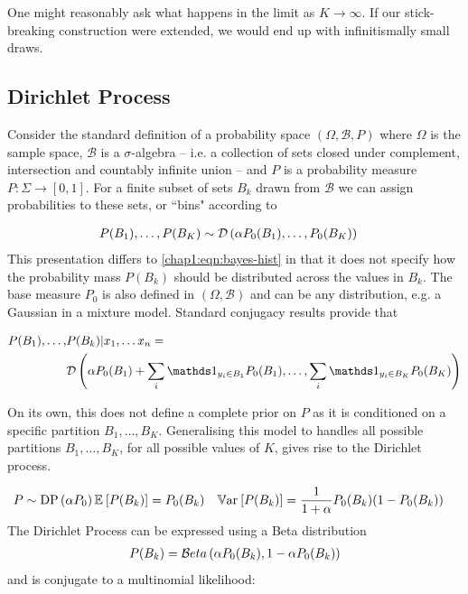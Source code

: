 One might reasonably ask what happens in the limit as $K \rightarrow \infty$. If our stick-breaking construction were extended, we would end up with infinitismally small draws.


\newcommand \sampspace { { \Omega } }
\newcommand \borel { { \mathcal{B} } }

\subsection{Dirichlet Process}
Consider the standard definition of a probability space $(\sampspace, \borel, P)$ where $\sampspace $ is the sample space, $\borel$ is a $\sigma$-algebra -- i.e. a collection of sets closed under complement, intersection and countably infinite union -- and $P$ is a probability measure $P : \Sigma \rightarrow [0,1]$. For a finite subset of sets $B_k$ drawn from $\borel$ we can assign probabilities to these sets, or ``bins" according to

\begin{align}
P(B_1), \ldots, P(B_K) & \sim \mathcal{D} \left( {\alpha P_0 (B_1), \ldots, P_0 (B_K)} \right) \end{align}
This presentation differs to \eqref{chap1:eqn:bayes-hist} in that it does not specify how the probability mass $P(B_k)$ should be distributed across the values in $B_k$. The base measure $P_0$ is also defined in $(\sampspace, \borel)$ and can be any distribution, e.g. a Gaussian in a mixture model. Standard conjugacy results provide that

\begin{align}
\begin{split}
P(B_1), \ldots, &P(B_k) | x_1, \ldots x_n
= \\
& \dir{\alpha P_0(B_1) + \sum_i \one_{y_i \in B_1}P_0(B_1), \ldots, \sum_i \one_{y_i \in B_K} P_0(B_K)}
\end{split}
\end{align}

On its own, this does not define a complete prior on $P$ as it is conditioned on a specific partition $B_1, \ldots, B_K$. Generalising this model to handles all possible partitions $B_1, \ldots, B_K$, for all possible values of $K$, gives rise to the Dirichlet process.

\begin{align}
P \sim \text{DP} \left( {\alpha P_0} \right)
\mathbb{E}_{ {  } }\left[ P(B_k) \right] &= P_0 (B_k) &
\mathbb{V}\text{ar}_{ {  } }\left[ P(B_k) \right] &= \frac{1}{ {1 + \alpha} } P_0(B_k) (1 - P_0 (B_k) )
\end{align}
The Dirichlet Process can be expressed using a Beta distribution
\begin{align}
P(B_k) = \mathcal{B}eta \left( {\alpha P_0(B_k)}, {1 - \alpha P_0(B_k)} \right)
\end{align}
and is conjugate to a multinomial likelihood:




